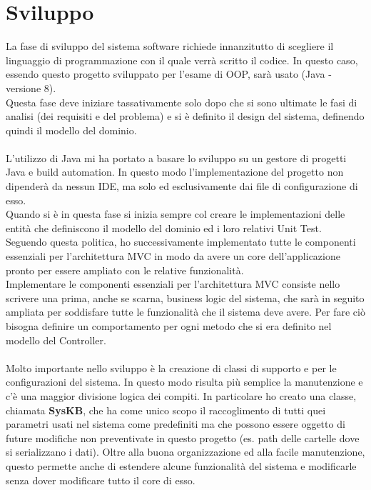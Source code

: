 \documentclass{article}
\begin{document}
  \section{Sviluppo}
  La fase di sviluppo del sistema software richiede innanzitutto di scegliere il linguaggio di programmazione con il quale verrà scritto il codice. In questo caso, essendo questo progetto
  sviluppato per l'esame di OOP, sarà usato (Java - versione 8).\\
  Questa fase deve iniziare tassativamente solo dopo che si sono ultimate le fasi di analisi (dei requisiti e del problema) e si è definito il design del sistema, definendo quindi
  il modello del dominio.\\
  \\L'utilizzo di Java mi ha portato a basare lo sviluppo su un gestore di progetti Java e build automation. In questo modo l'implementazione del progetto non dipenderà da nessun IDE,
  ma solo ed esclusivamente dai file di configurazione di esso.\\
  Quando si è in questa fase si inizia sempre col creare le implementazioni delle entità che definiscono il modello del dominio ed i loro relativi Unit Test. Seguendo questa politica, ho successivamente
  implementato tutte le componenti essenziali per l'architettura MVC in modo da avere un core dell'applicazione pronto per essere ampliato con le relative funzionalità.\\
  Implementare le componenti essenziali per l'architettura MVC consiste nello scrivere una prima, anche se scarna, business logic del sistema, che sarà in seguito ampliata per soddisfare tutte le funzionalità
  che il sistema deve avere. Per fare ciò bisogna definire un comportamento per ogni metodo che si era definito nel modello del Controller.\\
  \\Molto importante nello sviluppo è la creazione di classi di supporto e per le configurazioni del sistema. In questo modo risulta più semplice
  la manutenzione e c'è una maggior divisione logica dei compiti. In particolare ho creato una classe, chiamata \textbf{SysKB}, che ha come unico scopo il raccoglimento
  di tutti quei parametri usati nel sistema come predefiniti ma che possono essere oggetto di future modifiche non preventivate in questo progetto (es. path
  delle cartelle dove si serializzano i dati). Oltre alla buona organizzazione ed alla facile manutenzione, questo permette anche di estendere alcune funzionalità
  del sistema e modificarle senza dover modificare tutto il core di esso.
\end{document}
